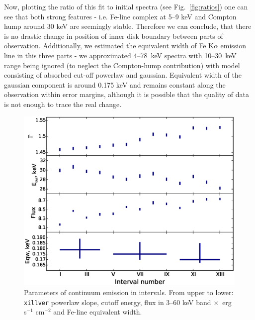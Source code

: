 \documentclass[a4paper,fleqn,usenatbib]{mnras}
\begin{document}
Now, plotting the ratio of this fit to initial spectra (see Fig.~\ref{fig:ratios}) one can see that both strong features - i.e. Fe-line complex at 5--9 keV and Compton hump around 30 keV are seemingly stable. 
Therefore we can conclude, that there is no drastic change in position of inner disk boundary between parts of observation. 
Additionally, we estimated the equivalent width of  Fe K$\alpha$ emission line in this three parts - we approximated 4--78~keV spectra with 10--30~keV range being ignored (to neglect the Compton-hump contribution) with model consisting of absorbed cut-off powerlaw and gaussian. 
Equivalent width of the gaussian component is around 0.175 keV and remains constant along the observation within error margins, although it is possible that the quality of data is not enough to trace the real change.

\begin{figure}
\centerline{\includegraphics[width=\linewidth]{intspe_v04.eps}}
\caption{Parameters of continuum emission in intervals. From upper to lower: \texttt{xillver} powerlaw slope, cutoff energy,  flux in 3--60 keV band $\times$\, erg s$^{-1}$ cm$^{-2}$ and Fe-line equivalent width.} 
\label{fig:intspe}
\end{figure}  
\end{document}
